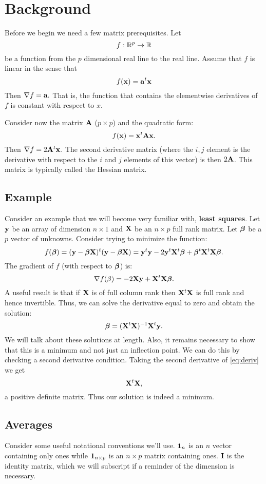\chapter{Background}

Before we begin we need a few matrix prerequisites. Let
$$
f: \mathbb{R}^p \rightarrow \mathbb{R}
$$
be a function from the $p$ dimensional real line to the real line.
Assume that $f$ is linear in the sense that
$$
f(\mathbf{x}) = \mathbf{a}^t \mathbf{x}
$$
Then $ \nabla f = \mathbf{a}.$ That is, the function that
contains the elementwise derivatives of $f$ is constant
with respect to $x$. 

Consider now the matrix $\mathbf{A}$
($p\times p$) and the quadratic form:
$$
f(\mathbf{x}) =  \mathbf{x}^t \mathbf{A} \mathbf{x}.
$$
Then  $ \nabla f = 2 \mathbf{A}^t \mathbf{x}.$ The second derivative matrix
(where the $i, j$ element is the derivative
with respect to the $i$ and $j$ elements of this vector)
is then $2 \mathbf{A} $. This matrix is typically called the
Hessian matrix. 

\section{Example}

Consider an example that we will become very familiar with, {\bf least squares}.
Let $\mathbf{y}$ be an array of dimension $n\times 1$ and 
$\mathbf{X}$ be an $n\times p$ full rank matrix. Let $\boldsymbol{\beta}$ be a
$p$ vector of unknowns. Consider trying to minimize the function:
$$
f(\boldsymbol{\beta}) = (\mathbf{y} - \boldsymbol{\beta} \mathbf{X})^t (\mathbf{y} - \boldsymbol{\beta} \mathbf{X})
= \mathbf{y}^t \mathbf{y} - 2 \mathbf{y}^t \mathbf{X}^t \boldsymbol{\beta} + \boldsymbol{\beta}^t \mathbf{X}^t \mathbf{X} \boldsymbol{\beta}.
$$
The gradient of $f$ (with respect to $\boldsymbol{\beta}$) is:
\begin{equation}
\label{eq:deriv}
\nabla f(\beta) = -2 \mathbf{X} \mathbf{y} + \mathbf{X}^t\mathbf{X} \boldsymbol{\beta}.
\end{equation}
A useful result is that if $\mathbf{X}$ is of full column rank then
$\mathbf{X}^t \mathbf{X}$ is full rank and hence invertible. Thus, we can
solve the derivative equal to zero and obtain the solution:
$$
\boldsymbol{\beta} = (\mathbf{X}^t \mathbf{X})^{-1} \mathbf{X}^t \mathbf{y}. 
$$
We will talk about these solutions at length. Also, it remains
necessary to show that this is a minimum and not just an
inflection point. We can do this by checking a second derivative
condition. Taking the second derivative of \ref{eq:deriv} we 
get
$$
\mathbf{X}^t\mathbf{X},
$$
a positive definite matrix. Thus our solution is indeed a minimum.

\section{Averages}
Consider some useful notational conventions we'll use. 
$\mathbf{1}_n$ is an  $n$ vector containing only ones while
$\mathbf{1}_{n\times p}$ is an $n\times p$ matrix containing ones.
$\mathbf{I}$ is the identity matrix, which we will subscript if a
reminder of the dimension is necessary.


